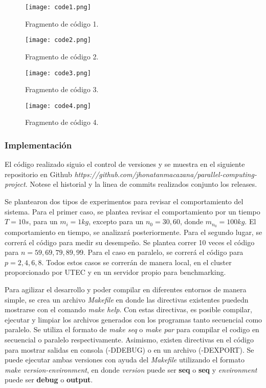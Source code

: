 \begin{figure}
	\centering
	\texttt{[image: code1.png]}
	\caption{Fragmento de código 1.}
	\label{fig:code1}
\end{figure}

\begin{figure}
	\centering
	\texttt{[image: code2.png]}
	\caption{Fragmento de código 2.}
	\label{fig:code2}
\end{figure}


\begin{figure}
	\centering
	\texttt{[image: code3.png]}
	\caption{Fragmento de código 3.}
	\label{fig:code3}
\end{figure}

\begin{figure}
	\centering
	\texttt{[image: code4.png]}
	\caption{Fragmento de código 4.}
	\label{fig:code4}
\end{figure}

\subsubsection{Implementación}
El código realizado siguio el control de versiones  y se muestra en el siguiente repositorio en Github \textit{https://github.com/jhonatanmacazana/parallel-computing-project}. Notese el historial y la linea de commits realizados conjunto los releases.

Se plantearon dos tipos de experimentos para revisar el comportamiento del sistema. Para el primer caso, se plantea revisar el comportamiento por un tiempo $T = 10s$, para un $m_i = 1 kg$, excepto para un $n_0 = 30, 60$, donde $m_{n_0} = 100 kg$. El comportamiento en tiempo, se analizará posteriormente. Para el segundo lugar, se correrá el código para medir su desempeño. Se plantea correr 10 veces el código para $n={59,69,79,89,99}$. Para el caso en paralelo, se correrá el código para $p={2,4,6,8}$. Todos estos casos se correrán de manera local, en el cluster proporcionado por UTEC y en un servidor propio para benchmarking.

Para agilizar el desarrollo y poder compilar en diferentes entornos de manera simple, se crea un archivo \textit{Makefile} en donde las directivas existentes puededn mostrarse con el comando \textit{make help}. Con estas directivas, es posible compilar, ejecutar y limpiar los archivos generados con los programas tanto secuencial como paralelo. Se utiliza el formato de \textit{make seq} o \textit{make par} para compilar el codigo en secuencial o paralelo respectivamente. Asimismo, existen directivas en el código para mostrar salidas en consola (-DDEBUG) o en un archivo (-DEXPORT). Se puede ejecutar ambas versiones con ayuda del \textit{Makefile} utilizando el formato \textit{make version-environment}, en donde \textit{version} puede ser \textbf{seq} o \textbf{seq} y \textit{environment} puede ser \textbf{debug} o \textbf{output}. 

